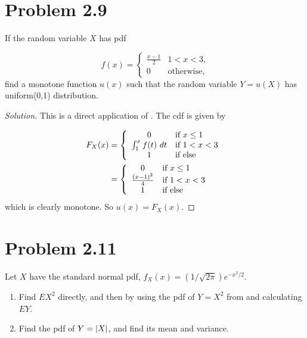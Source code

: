 \documentclass[12pt,letterpaper,reqno]{amsart}
\numberwithin{equation}{subsection}
\begin{document}
\newpage
\section{Problem 2.9}

If the random variable $X$ has pdf

\[ f(x) = \left\{ \begin{array}{cl}
     \frac{x-1}{2} & \mbox{$1<x<3$,} \\
     0 & \mbox{otherwise,}
\end{array} \right. \]
find a monotone function $u(x)$ such that the random variable $Y = u(X)$ has uniform(0,1) distribution.

\begin{proof}[Solution] This is a direct application of \cite[Theorem 2.1.10 on page 54]{Berger-Casella}. The cdf is given by

\begin{align*}
    F_X(x) &= \left\{ \begin{array}{cl}
         0 & \mbox{if $x \leq 1$} \\
         \myint{f(t)}{t}{1}{x} & \mbox{if $1 < x < 3$} \\
         1 & \mbox{if else}
    \end{array} \right. \\
    &= \left\{ \begin{array}{cl}
         0 & \mbox{if $x \leq 1$} \\
         \frac{(x-1)^2}{4} & \mbox{if $1 < x < 3$} \\
         1 & \mbox{if else}
    \end{array} \right.
\end{align*}
which is clearly monotone. So $u(x) = F_X(x)$.
\end{proof}

\newpage
\section{Problem 2.11}

Let $X$ have the standard normal pdf, $f_X(x) = (1/ \sqrt{2\pi}) e^{-x^2/2}$.

\begin{enumerate}[label=(\alph*),leftmargin=*]
    \item Find $EX^2$ directly, and then by using the pdf of $Y = X^2$ from \cite[Example 2.1.7 on page 52]{Berger-Casella} and calculating $EY$.
    
    \item Find the pdf of $Y = \Abs{X}$, and find its mean and variance.
\end{enumerate}~\\
\end{document}
